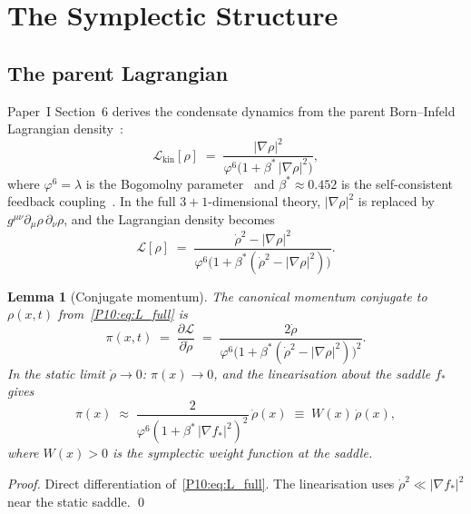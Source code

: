 \documentclass[11pt,a4paper]{article}
\newtheorem{lemma}[theorem]{Lemma}
\theoremstyle{definition}
\theoremstyle{remark}
\newcommand{\vp}{\varphi}
\newcommand{\lam}{\lambda}
\newcommand{\bst}{\beta^{*}}
\begin{document}
\section{The Symplectic Structure}
\label{P10:sec:symplectic}

\subsection{The parent Lagrangian}

Paper~I Section~6 derives the condensate dynamics from the parent
Born--Infeld Lagrangian density~\cite{Paper1}:
\begin{equation}
  \mathcal{L}_\mathrm{kin}[\rho]
  \;=\; \frac{|\nabla\rho|^2}{\vp^6\bigl(1+\bst\,|\nabla\rho|^2\bigr)},
  \label{P10:eq:Lkin}
\end{equation}
where $\vp^6=\lam$ is the Bogomolny parameter~\cite{Paper1}
and $\bst\approx0.452$ is the self-consistent feedback coupling~\cite{Paper7}.
In the full $3+1$-dimensional theory, $|\nabla\rho|^2$
is replaced by $g^{\mu\nu}\partial_\mu\rho\,\partial_\nu\rho$, and the
Lagrangian density becomes
\begin{equation}
  \mathcal{L}[\rho]
  \;=\; \frac{\dot\rho^2 - |\nabla\rho|^2}{\vp^6
         \bigl(1+\bst(\dot\rho^2-|\nabla\rho|^2)\bigr)}.
  \label{P10:eq:L_full}
\end{equation}

\begin{lemma}[Conjugate momentum]
\label{P10:lem:momentum}
The canonical momentum conjugate to $\rho(x,t)$ from~\eqref{P10:eq:L_full} is
\begin{equation}
  \pi(x,t)
  \;=\; \frac{\partial\mathcal{L}}{\partial\dot\rho}
  \;=\; \frac{2\dot\rho}{\vp^6\bigl(1+\bst(\dot\rho^2-|\nabla\rho|^2)\bigr)^2}.
  \label{P10:eq:momentum}
\end{equation}
In the static limit $\dot\rho\to0$:
$\pi(x)\to 0$, and the linearisation about the saddle $f_*$ gives
\begin{equation}
  \pi(x) \;\approx\; \frac{2}{\vp^6(1+\bst\,|\nabla f_*|^2)^2}\,\dot\rho(x)
  \;\equiv\; W(x)\,\dot\rho(x),
  \label{P10:eq:momentum_linear}
\end{equation}
where $W(x) > 0$ is the \emph{symplectic weight function} at the saddle.
\end{lemma}

\begin{proof}
Direct differentiation of~\eqref{P10:eq:L_full}.
The linearisation uses $\dot\rho^2\ll|\nabla f_*|^2$ near the static saddle.
\qed
\end{proof}
\end{document}
